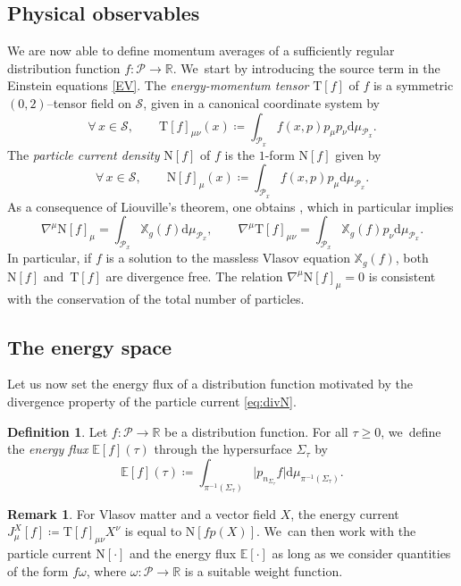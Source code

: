 \documentclass[10pt]{amsart}
\theoremstyle{plain}
\theoremstyle{definition}
\newtheorem{definition}[proposition]{Definition}
\newtheorem{remark}[proposition]{Remark}
\newcommand\R{{\mathbb{R}}}
\newcommand\T{{\mathbb{X}}}
\newcommand\dr{{\mathrm{d}}}
\begin{document}
\subsection{Physical observables}

We are now able to define momentum averages of a sufficiently regular distribution function $f \colon \mathcal{P} \to \R$. We~start by introducing the source term in the Einstein equations \eqref{EV}. The \emph{energy-momentum tensor} $\mathrm{T}[f]$ of $f$ is a symmetric $(0,2)$--tensor field on $\mathcal{S}$, given in a canonical coordinate system by
\[
\forall \, x \in \mathcal{S},\qquad \mathrm{T}[f]_{\mu\nu}(x) \coloneqq \int_{\mathcal{P}_x} f(x,p) p_{\mu} p_{\nu} \dr \mu_{\mathcal{P}_x}.
\]
The \emph{particle current density} $\mathrm{N}[f]$ of $f$ is the $1$-form $\mathrm{N}[f]$ given by
\[
\forall \, x \in \mathcal{S},\qquad \mathrm{N}[f]_{\mu}(x) \coloneqq \int_{\mathcal{P}_x} f(x,p) p_{\mu} \dr \mu_{\mathcal{P}_x}.
\]
As a consequence of Liouville's theorem, one obtains \cite[Th.\,3]{AGS}, which in particular implies
\begin{equation}\label{eq:divN}
\nabla^{\mu}\mathrm{N}[f]_\mu =\int_{\mathcal{P}_x} \T_g(f) \dr \mu_{\mathcal{P}_x},\qquad \nabla^{\mu}\mathrm{T}[f]_{\mu\nu} = \int_{\mathcal{P}_x}\T_g(f)p_{\nu}\dr \mu_{\mathcal{P}_x}.
\end{equation}
In particular, if $f$ is a solution to the massless Vlasov equation $\T_g(f)$, both~$\mathrm{N}[f]$ and~$\mathrm{T}[f]$ are divergence free. The relation $\nabla^\mu \mathrm{N}[f]_\mu =0$ is consistent with the conservation of the total number of particles.

\subsection{The energy space}\label{subsect_energy_space}

Let us now set the energy flux of a distribution function motivated by the divergence property of the particle current \eqref{eq:divN}.

\begin{definition}
Let $f \colon \mathcal{P} \to \R$ be a distribution function. For all $\tau \geq 0$, we~define the \emph{energy flux} $\mathbb{E} [f](\tau)$ through the hypersurface $\Sigma_\tau$ by
\[
\mathbb{E} [f](\tau) \coloneqq \int_{\pi^{-1}(\Sigma_\tau)} \big| p_{n_{\Sigma_\tau}} f \big| \dr \mu_{\pi^{-1}(\Sigma_\tau)}.
\]
\end{definition}
\begin{remark}
For Vlasov matter and a vector field $X$, the energy current $J_{\mu}^X[f]\coloneqq \mathrm{T}[f]_{\mu \nu} X^{\nu}$ is equal to $\mathrm{N}[fp(X)]$. We~can then work with the particle current $\mathrm{N}[\cdot ]$ and the energy flux $\mathbb{E} [\cdot]$ as long as we consider quantities of the form $f\omega$, where $\omega \colon \mathcal{P}\to \R$ is a suitable weight function.
\end{remark}
\end{document}
